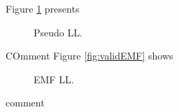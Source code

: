 \documentclass[../report/report.tex]{subfiles}
\begin{document}
Figure \ref{fig:validLL} presents
\begin{figure}[!htb]
 \label{fig:validLL}
  \caption[1]{Pseudo LL.}
\end{figure}
COmment
Figure \ref{fig:validEMF} shows
\begin{figure}[!htb]
  \caption[1]{EMF LL.}
\end{figure}
comment
\end{document}
